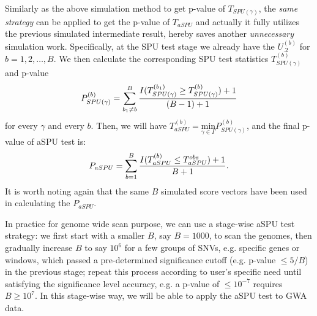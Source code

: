 \documentclass[12pt]{article}
\begin{document}
Similarly as the above simulation method to get p-value of $T_{ SPU(\gamma) }$, the \textit{same strategy} can be applied to get the p-value of $T_{aSPU}$ and actually it fully utilizes the previous simulated intermediate result, hereby saves another \textit{unnecessary} simulation work. Specifically, at the SPU test stage we already have the $U_{.2}^{ (b) }$ for $b = 1,2,\ldots,B$. We then calculate the corresponding SPU test statistics $T^{ (b) }_{ SPU(\gamma) }$ and p-value 
$$
P^{ (b) }_{ SPU(\gamma) } =  \sum_{b_1 \neq b}^B { I(T^{ (b_1) }_{ SPU(\gamma) } \geq T^{ (b) }_{ SPU(\gamma) } ) + 1  \over (B-1) + 1 } 
$$
for every $\gamma$ and every $b$. Then, we will have $ 
T ^ {(b)} _{aSPU} = \underset{\gamma\in\Gamma}{ \textrm{min} } P^{ (b) }_{ SPU(\gamma) }
$, and the final p-value of aSPU test is:
$$
P_{aSPU} = \sum_{b=1}^B { I(T ^ {(b)} _{aSPU} \leq T ^ {obs} _{aSPU} ) + 1  \over B + 1 }.
$$
It is worth noting again that the same $B$ simulated score vectors have been used in calculating the $P_{aSPU}$. 

In practice for genome wide scan purpose, we can use a stage-wise aSPU test strategy: we first start with a smaller $B$, say $B = 1000$, to scan the genomes, then gradually increase $B$ to say $10^6$ for a few groups of SNVs, e.g. specific genes or windows, which passed a pre-determined significance cutoff (e.g. p-value $ \leq 5/B$) in the previous stage; repeat this process according to user's specific need until satisfying the significance level accuracy, e.g. a p-value of $\leq 10 ^ {-7}$ requires $B \geq 10^7$. In this stage-wise way, we will be able to apply the aSPU test to GWA data. 
\end{document}
